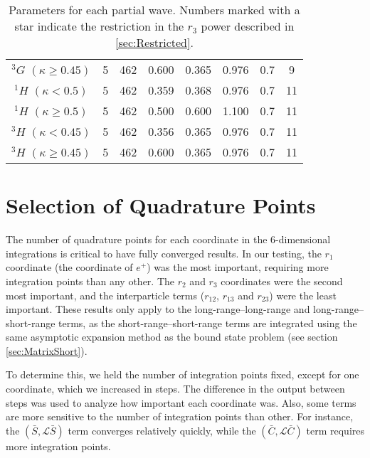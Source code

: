 \documentclass[Dissertation.tex]{subfiles}
\begin{document}
\begin{table}[H]
\begin{tabular}{cclccccc}
    $^3G$ $(\kappa \geq 0.45)$ & 5 & 462         & 0.600 & 0.365 & 0.976 & 0.7 & 9 \\
	$^1H$ $(\kappa < 0.5)$     & 5 & 462         & 0.359 & 0.368 & 0.976 & 0.7 & 11 \\
	$^1H$ $(\kappa \geq 0.5)$  & 5 & 462         & 0.500 & 0.600 & 1.100 & 0.7 & 11 \\
	$^3H$ $(\kappa < 0.45)$    & 5 & 462         & 0.356 & 0.365 & 0.976 & 0.7 & 11 \\
    $^3H$ $(\kappa \geq 0.45)$ & 5 & 462         & 0.600 & 0.365 & 0.976 & 0.7 & 11 \\
	\bottomrule
  \end{tabular}
  \caption[Parameters for each partial wave]{Parameters for each partial wave. Numbers marked with a star indicate the
restriction in the $r_3$ power described in \cref{sec:Restricted}.}
  \label{tab:Nonlinear}
\end{table}	


\section{Selection of Quadrature Points}
\label{sec:SelQuadPoints1}


The number of quadrature points for each coordinate in the 6-dimensional integrations is critical to have fully converged results. In our testing, the $r_1$ coordinate (the coordinate of $e^+$) was the most important, requiring more integration points than any other. The $r_2$ and $r_3$ coordinates were the second most important, and the interparticle terms ($r_{12}$, $r_{13}$ and $r_{23}$) were the least important. These results only apply to the long-range--long-range and long-range--short-range terms, as the short-range--short-range terms are integrated using the same asymptotic expansion method as the bound state problem (see section \ref{sec:MatrixShort}).

To determine this, we held the number of integration points fixed, except for one coordinate, which we increased in steps. The difference in the output between steps was used to analyze how important each coordinate was. Also, some terms are more sensitive to the number of integration points than other. For instance, the $(\bar{S},\mathcal{L} \bar{S})$ term converges relatively quickly, while the $(\bar{C},\mathcal{L} \bar{C})$ term requires more integration points.
\end{document}
